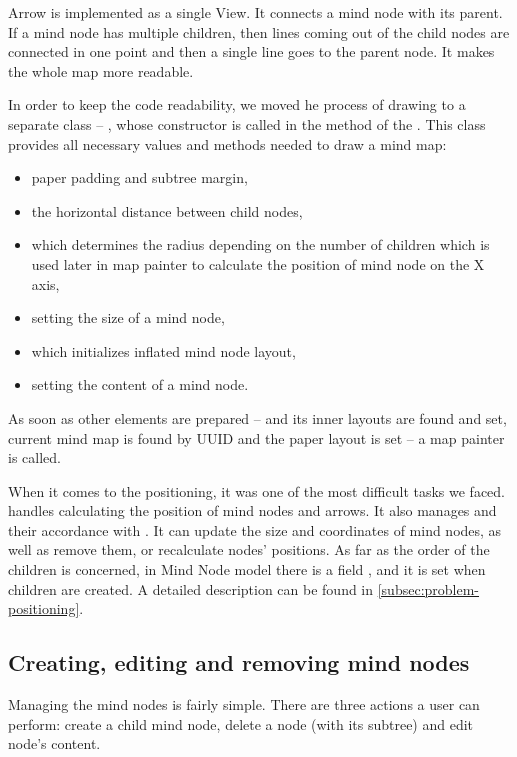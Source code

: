 Arrow is implemented as a single View. It connects a mind node with its parent. If a mind node has multiple children, then lines coming out of the child nodes are connected in one point and then a single line goes to the parent node. It makes the whole map more readable. 

In order to keep the code readability, we moved he process of drawing to a separate class -- , whose constructor is called in the  method of the . This class provides all necessary values and methods needed to draw a mind map:
\begin{itemize}
	\item paper padding and  subtree margin,
	\item the horizontal distance between child nodes,
	\item {} which determines the radius depending on the number of children which is used later in map painter to calculate the position of mind node on the X axis,
	\item {} setting the size of a mind node,
	\item {} which initializes inflated mind node layout,
	\item {} setting the content of a mind node.
\end{itemize}
 As soon as other elements are prepared --   and its inner  layouts are found and set, current mind map is found by UUID and the paper layout is set -- a map painter is called. 

When it comes to the positioning, it was one of the most difficult tasks we faced.  handles calculating the position of mind nodes and arrows. It also manages  and their accordance with . It can update the size and coordinates of mind nodes, as well as remove them, or recalculate nodes' positions. As far as the order of the children is concerned, in Mind Node model there is a field , and it is set when children are created. A detailed description can be found in \cref{subsec:problem-positioning}.

\subsection{Creating, editing and removing mind nodes}
\label{subsec:drawing}
Managing the mind nodes is fairly simple. There are three actions a user can perform:  create a child mind node, delete a node (with its subtree) and edit node's content. 

